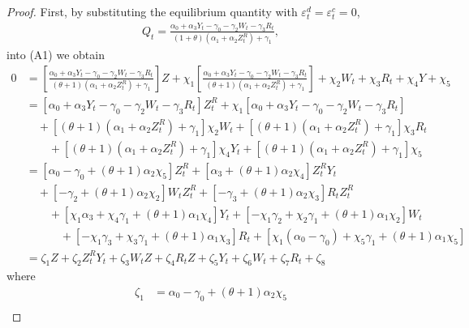 \documentclass[11pt, a4paper]{article}
\begin{document}
\begin{proof}
    First, by substituting the equilibrium quantity with $\varepsilon^{d}_{t} = \varepsilon^{c}_{t} = 0$,
    \begin{align*}
        Q_{t} =  \frac{\alpha_0 + \alpha_3 Y_t - \gamma_0 - \gamma_2 W_{t} - \gamma_3 R_{t}}{(1 + \theta) (\alpha_1 + \alpha_2 Z^{R}_{t}) + \gamma_1},
    \end{align*}
    into (A1) we obtain
    \begin{align*}
        0&=\left[\frac{\alpha_0 + \alpha_3 Y_{t} -\gamma_0 - \gamma_2 W_{t} -  \gamma_3 R_{t}}{(\theta + 1) (\alpha_1 + \alpha_2 Z^R_{t}) + \gamma_1}\right]Z + \chi_1 \left[\frac{\alpha_0 + \alpha_3 Y_{t} -\gamma_0 - \gamma_2 W_{t} -  \gamma_3 R_{t}}{(\theta + 1) (\alpha_1 + \alpha_2 Z^R_{t}) + \gamma_1}\right] + \chi_2 W_{t} + \chi_3 R_{t} + \chi_4 Y + \chi_5\nonumber\\
        &=[\alpha_0 + \alpha_3 Y_{t} -\gamma_0 - \gamma_2 W_{t} -  \gamma_3 R_{t}]Z^R_{t} + \chi_1 [\alpha_0 + \alpha_3 Y_{t} -\gamma_0 - \gamma_2 W_{t} -  \gamma_3 R_{t}]\\
        &\quad+ [(\theta + 1) (\alpha_1 + \alpha_2 Z^R_{t}) + \gamma_1]\chi_2 W_{t} + [(\theta + 1) (\alpha_1 + \alpha_2 Z^R_{t}) + \gamma_1]\chi_3 R_{t}\\
        &\quad\quad + [(\theta + 1) (\alpha_1 + \alpha_2 Z^R_{t}) + \gamma_1]\chi_4 Y_{t} + [(\theta + 1) (\alpha_1 + \alpha_2 Z^R_{t}) + \gamma_1]\chi_5\nonumber\\
        &=[\alpha_0-\gamma_0+(\theta + 1)\alpha_2 \chi_5]Z^R_{t}+[\alpha_3+(\theta + 1)\alpha_2 \chi_4]Z^R_{t} Y_{t}\\
        &\quad +[-\gamma_2+(\theta + 1)\alpha_2 \chi_2]W_{t}Z^R_{t} + [-\gamma_3+(\theta + 1)\alpha_2  \chi_3]R_{t}Z^R_{t} \\
        &\quad\quad +[\chi_1 \alpha_3+\chi_4\gamma_1 +(\theta+1)\alpha_1 \chi_4]Y_{t}+ [-\chi_1\gamma_2+\chi_2\gamma_1+(\theta+1)\alpha_1 \chi_2]W_{t}\\
        &\quad\quad\quad +[-\chi_1\gamma_3 +\chi_3 \gamma_1 +(\theta+1)\alpha_1 \chi_3] R_{t} +[\chi_1 (\alpha_0 -\gamma_0)+\chi_5\gamma_1 +(\theta+1)\alpha_1 \chi_5]\nonumber\\
        &=\zeta_1 Z + \zeta_2 Z^R_{t} Y_{t} + \zeta_3 W_{t}Z + \zeta_4 R_{t}Z + \zeta_5 Y_{t} + \zeta_6 W_{t} + \zeta_7 R_{t} + \zeta_8 
    \end{align*}
    where
    \begin{align*}
        \zeta_1 &= \alpha_0-\gamma_{0}+(\theta + 1)\alpha_{2} \chi_5\\

\end{align*}
\end{proof}
\end{document}
